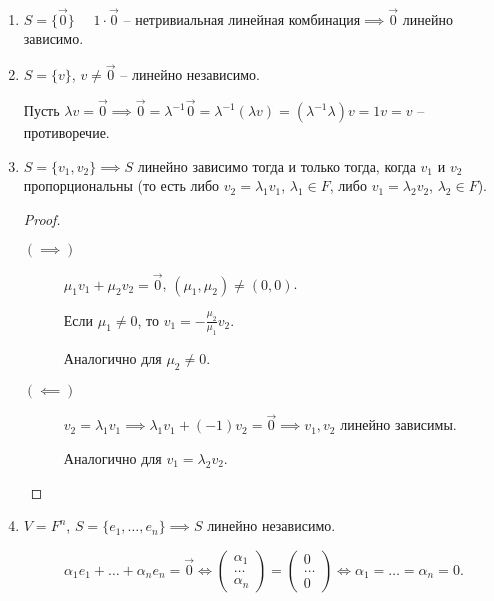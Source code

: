 \begin{example}~
    \begin{enumerate}
        \item $S = \{\overrightarrow{0}\} \quad$ $1 \cdot \overrightarrow{0}$ -- нетривиальная линейная комбинация$\implies \overrightarrow{0}$ линейно зависимо.
        \item $S = \{v\}$, $v \neq \overrightarrow{0}$ -- линейно независимо.

            Пусть $\lambda v = \overrightarrow{0} \implies \overrightarrow{0} = \lambda^{-1} \overrightarrow{0} = \lambda^{-1}(\lambda v) = (\lambda^{-1} \lambda) v = 1v = v$ -- противоречие.

        \item 
            $S = \{v_1, v_2\} \implies S$ линейно зависимо тогда и только тогда, когда $v_1$ и $v_2$ пропорциональны (то есть либо $v_2 = \lambda_1 v_1$, $\lambda_1 \in F$, либо $v_1 = \lambda_2 v_2$, $\lambda_2 \in F$).
            \begin{proof}~
                \begin{description}
                \item[$(\implies)$] 
                    $\mu_1 v_1 + \mu_2 v_2 = \overrightarrow{0}$, $(\mu_1, \mu_2) \neq (0, 0)$.

                    Если $\mu_1 \neq 0$, то $v_1 = -\frac{\mu_2}{\mu_1} v_2$. 

                    Аналогично для $\mu_2 \neq 0$.

                \item[$(\impliedby)$]
                    $v_2 = \lambda_1 v_1 \implies \lambda_1 v_1 + (-1) v_2 = \overrightarrow{0} \implies v_1, v_2$ линейно зависимы.

                    Аналогично для $v_1 = \lambda_2 v_2$. \qedhere
                \end{description}
            \end{proof}

        \item
            $V = F^n$, $S = \{e_1, \dots, e_n\} \implies S$ линейно независимо.

            \begin{equation*}
                \alpha_1 e_1 + \dots + \alpha_n e_n = \overrightarrow{0} \iff \begin{pmatrix} \alpha_1 \\ \dots \\ \alpha_n \end{pmatrix} = \begin{pmatrix} 0 \\ \dots \\ 0 \end{pmatrix} \iff \alpha_1 = \dots = \alpha_n = 0
            .\end{equation*}
    \end{enumerate}
\end{example}



